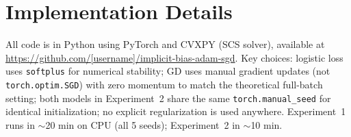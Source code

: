\documentclass{article}
\begin{document}
\appendix
\section{Implementation Details}
\label{app:implementation}

All code is in Python using PyTorch and CVXPY (SCS solver), available at \url{https://github.com/[username]/implicit-bias-adam-sgd}. Key choices: logistic loss uses \texttt{softplus} for numerical stability; GD uses manual gradient updates (not \texttt{torch.optim.SGD}) with zero momentum to match the theoretical full-batch setting; both models in Experiment~2 share the same \texttt{torch.manual\_seed} for identical initialization; no explicit regularization is used anywhere. Experiment~1 runs in $\sim$20 min on CPU (all 5 seeds); Experiment~2 in $\sim$10 min.
\end{document}
